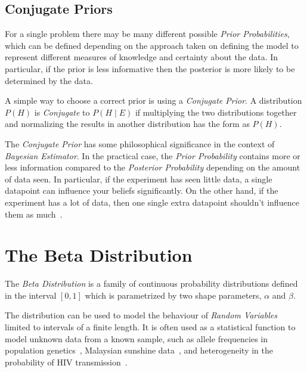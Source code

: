 \subsection{Conjugate Priors}
\label{subsec:conjugate}

For a single problem there may be many different possible \emph{Prior Probabilities}, which can be defined depending on the approach taken on defining the model to represent different measures of knowledge and certainty about the data\footnotemark{}. In particular, if the prior is less informative then the posterior is more likely to be determined by the data.


A simple way to choose a correct prior is using a \emph{Conjugate Prior}. A distribution $P \left( H \right)$ is \emph{Conjugate} to $P \left( H \mid E \right)$ if multiplying the two distributions together and normalizing the results in another distribution has the form as $P \left( H \right)$.

The \emph{Conjugate Prior} has some philosophical significance in the context of \emph{Bayesian Estimator}. In the practical case, the \emph{Prior Probability} contains more or less information compared to the \emph{Posterior Probability} depending on the amount of data seen. In particular, if the experiment has seen little data, a single datapoint can influence your beliefs significantly. On the other hand, if the experiment has a lot of data, then one single extra datapoint shouldn't influence them as much~\cite{gelman2003}.

\section{The Beta Distribution}
\label{subsec:beta}

The \emph{Beta Distribution} is a family of continuous probability distributions defined in the interval $\left[ 0, 1 \right]$ which is parametrized by two shape parameters, $\alpha$ and $\beta$.

The distribution can be used to model the behaviour of \emph{Random Variables} limited to intervals of a finite length. It is often used as a statistical function to model unknown data from a known sample, such as allele frequencies in population genetics~\cite{Balding1995}, Malaysian sunshine data~\cite{Sulaiman1999573}, and heterogeneity in the probability of HIV transmission~\cite{SIM:SIM4780080110}.

